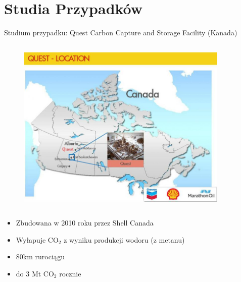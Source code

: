 \section{Studia Przypadków}


\begin{columnframe}{Studium przypadku: Quest Carbon Capture and Storage Facility (Kanada)}
    \begin{column}{0.5\textwidth}
        \begin{figure}
            \centering
            \includegraphics[width=0.9\textwidth, frame]{images/quest_alberta_canada_map.jpg}
        \end{figure}
    \end{column}
    \begin{column}{0.5\textwidth}
        \begin{itemize}
            \item Zbudowana w 2010 roku przez Shell Canada
            \item Wyłapuje CO$_2$ z wyniku produkcji wodoru (z metanu)
            \item 80km rurociągu
            \item do 3 Mt CO$_2$ rocznie
        \end{itemize}
    \end{column}
\end{columnframe}

